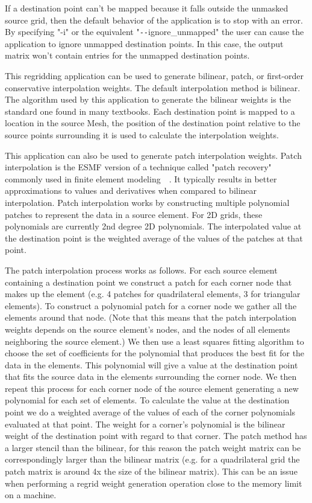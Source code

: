 If a destination point can't be mapped because it falls outside the unmasked source grid, then the default behavior of the application is to stop with an error. By specifying "-i" or the equivalent "\verb+--+ignore\_unmapped" the user can cause the application to ignore unmapped destination points. In this case, the output matrix won't contain entries for the unmapped destination points. 

 This regridding application can be used to generate bilinear, patch, or first-order conservative interpolation weights. The default interpolation method
is bilinear. The algorithm used by this application to generate the bilinear weights is the standard one found in
many textbooks.  Each destination point is mapped to a location in the source Mesh, the position of the destination point relative 
to the source points surrounding it is used to calculate the interpolation weights. 

This application can also be used to generate patch interpolation weights. Patch
interpolation is the ESMF version of a technique called "patch recovery" commonly
used in finite element modeling~\cite{PatchInterp1}~\cite{PatchInterp2}. It typically results in better approximations to values and derivatives when compared to bilinear interpolation.  
Patch interpolation works by constructing multiple polynomial patches to represent
the data in a source element. For 2D grids, these polynomials 
are currently 2nd degree 2D polynomials. The interpolated value at the destination point 
is the weighted average of the values of the patches at that point. 

The patch interpolation process works as follows. 
For each source element containing a destination point
we construct a patch for each corner node that makes up the element (e.g. 4 patches for 
quadrilateral elements, 3 for triangular elements). To construct a polynomial patch for
 a corner node we gather all the elements around that node. 
(Note that this means that the patch interpolation weights depends on the source 
element's nodes, and the nodes of all elements neighboring the source element.)  
We then use a least squares fitting algorithm to choose the set of coefficients 
for the polynomial that produces the best fit for the data in the elements. 
This polynomial will give a value at the destination point that fits the source data 
in the elements surrounding the corner node. We then repeat this process for each 
corner node of the source element generating a new polynomial for each set of elements.  
To calculate the value at the destination point we do a weighted average of the values 
of each of the corner polynomials evaluated at that point. The weight for a corner's 
polynomial is the bilinear weight of the destination point with regard to that corner.  
The patch method has a larger stencil than the bilinear, for this reason the patch weight matrix can be correspondingly larger
than the bilinear matrix (e.g. for a quadrilateral grid the patch matrix is around 4x the size of
the bilinear matrix). This can be an issue when performing a regrid weight generation operation close to the memory
limit on a machine. 



